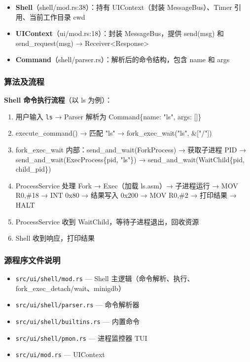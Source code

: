 \documentclass[UTF8,a4paper,12pt]{ctexart}
\begin{document}
\begin{itemize}
    \item \textbf{Shell}（shell/mod.rs:38）：持有 UIContext（封装 MessageBus）、Timer 引用、当前工作目录 cwd
    \item \textbf{UIContext}（ui/mod.rs:18）：封装 MessageBus，提供 send(msg) 和 send\_request(msg) → Receiver<Response>
    \item \textbf{Command}（shell/parser.rs）：解析后的命令结构，包含 name 和 args
\end{itemize}

\subsubsection{算法及流程}

\textbf{Shell 命令执行流程}（以 ls 为例）：

\begin{enumerate}[label=(\arabic*)]
    \item 用户输入 \texttt{ls} → Parser 解析为 Command\{name: "ls", args: []\}
    \item execute\_command() → 匹配 "ls" → fork\_exec\_wait("ls", \&["/"])
    \item fork\_exec\_wait 内部：send\_and\_wait(ForkProcess) → 获取子进程 PID → send\_and\_wait(ExecProcess\{pid, "ls"\}) → send\_and\_wait(WaitChild\{pid, child\_pid\})
    \item ProcessService 处理 Fork → Exec（加载 ls.asm）→ 子进程运行 → MOV R0,\#18 → INT 0x80 → 结果写入 0x200 → MOV R0,\#2 → 打印结果 → HALT
    \item ProcessService 收到 WaitChild，等待子进程退出，回收资源
    \item Shell 收到响应，打印结果
\end{enumerate}

\subsubsection{源程序文件说明}

\begin{itemize}
    \item \texttt{src/ui/shell/mod.rs} — Shell 主逻辑（命令解析、执行、fork\_exec\_detach/wait、minigdb）
    \item \texttt{src/ui/shell/parser.rs} — 命令解析器
    \item \texttt{src/ui/shell/builtins.rs} — 内置命令
    \item \texttt{src/ui/shell/pmon.rs} — 进程监控器 TUI
    \item \texttt{src/ui/mod.rs} — UIContext
\end{itemize}
\end{document}

